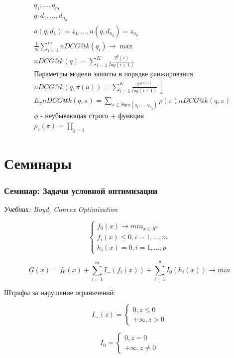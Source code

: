 \documentclass[a4paper, 12pt]{article}
\begin{document}
\begin{enumerate}
    \begin{align*}
        & q_1, \ldots, q_m \\
        & q: d_1, \ldots, d_{n_q} \\
        & a(q, d_1) = z_1, \ldots, a(q, d_{n_q}) = z_{n_q} \\
        & \frac{1}{m} \sum_{i = 1}^m nDCG@k(q_i) \rightarrow \max \\
        & nDCG@k(q) = \sum_{i = 1}^K \frac{2^y(i)}{log(i + 1)} \\
        & \textrm{Параметры модели зашиты в порядке ранжирования} \\
        & nDCG@k(q, \pi(a)) = \sum_{i = 1}^K \frac{2^{y(\pi(i)}}{log(i + 1)} \downarrow\\
        & E_{\pi}nDCG@k(q, \pi) = \sum_{\pi \in Sym(q_1, \ldots, q_{n_q})}
        p(\pi)nDCG@k(q, \pi) \\
        & \phi \textrm{ - неубывающая строго + функция} \\
        & p_z(\pi) = \prod_{j = 1}
    \end{align*}
\end{enumerate}
\pagebreak

\part{Семинары}
\section{Семинар: Задачи условной оптимизации}

\textit{Учебник: Boyd, Convex Optimization}

\[\begin{cases}
    f_0(x) \rightarrow min_{x \in R^d} \\
    f_i(x) \leq 0, i = 1, \ldots, m \\
    h_i(x) = 0, i = 1, \ldots, p
\end{cases}\]

\[G(x) = f_0(x) + \sum_{i = 1}^m I_{-}(f_i(x)) + \sum_{i = 1}^p I_0(h_i(x)) \rightarrow min\]

Штрафы за нарушение ограничений:

\[I_{-}(z) = \begin{cases}
    0, z \leq 0 \\
    + \infty, z > 0 
\end{cases}\]

\[I_{0} = \begin{cases}
    0, z = 0 \\
    + \infty, z \neq 0 
\end{cases}\]
\end{document}

